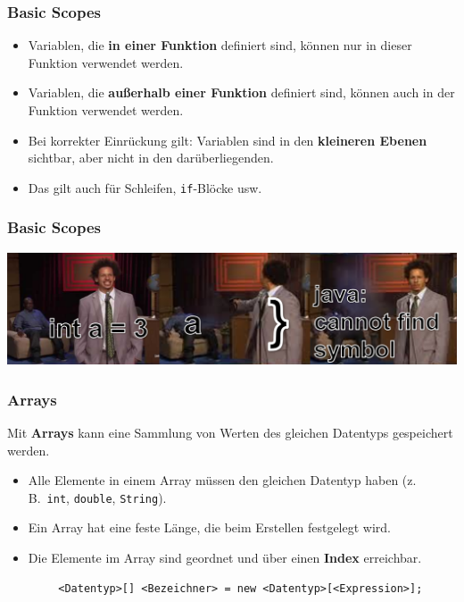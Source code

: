 \documentclass{../../presentation}
\begin{document}
\begin{frame}[fragile]
    \frametitle{Basic Scopes}
    \begin{itemize}
        \item Variablen, die \textbf{in einer Funktion} definiert sind, können nur in dieser Funktion verwendet werden.
        \item Variablen, die \textbf{außerhalb einer Funktion} definiert sind, können auch in der Funktion verwendet werden.
        \item Bei korrekter Einrückung gilt: Variablen sind in den \textbf{kleineren Ebenen} sichtbar, aber nicht in den darüberliegenden.
        \item Das gilt auch für Schleifen, \texttt{if}-Blöcke usw.
    \end{itemize}
\end{frame}

\begin{frame}[fragile]
    \frametitle{Basic Scopes}
    \includegraphics[width=1\linewidth]{img/scopesmemehoriz.png}
\end{frame}


\begin{frame}[fragile]
    \frametitle{Arrays}
    Mit \textbf{Arrays} kann eine Sammlung von Werten des gleichen Datentyps gespeichert werden.
    \begin{itemize}
        \item Alle Elemente in einem Array müssen den gleichen Datentyp haben (z.\,B.\ \texttt{int}, \texttt{double}, \texttt{String}).
        \item Ein Array hat eine feste Länge, die beim Erstellen festgelegt wird.
        \item Die Elemente im Array sind geordnet und über einen \textbf{Index} erreichbar.
    \end{itemize}
    \begin{verbatim}
        <Datentyp>[] <Bezeichner> = new <Datentyp>[<Expression>];
    \end{verbatim}
\end{frame}
\end{document}
